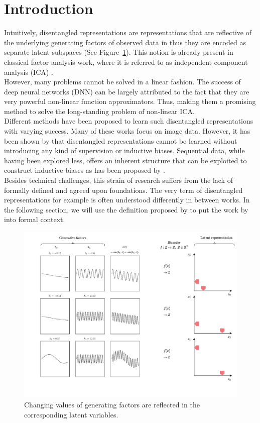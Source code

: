\documentclass{article} %
\begin{document}
\section*{Introduction}
Intuitively, disentangled representations are representations that are reflective of the underlying generating factors of observed data in thus they are encoded as separate latent subspaces (See Figure~\ref{fig:intuition}). This notion is already present in classical factor analysis work, where it is referred to as independent component analysis (ICA) \cite{comon1992independent}.\\
However, many problems cannot be solved in a linear fashion. The success of deep neural networks (DNN) can be largely attributed to the fact that they are very powerful non-linear function approximators. Thus, making them a promising method to solve the long-standing problem of non-linear ICA.\\
Different methods have been proposed to learn such disentangled representations \cite{higgins2016beta, chen2016infogan, kulkarni2015deep} with varying success. Many of these works focus on image data. However, it has been shown by \citet{locatello2019challenging} that disentangled representations cannot be learned without introducing any kind of supervision or inductive biases. Sequential data, while having been explored less, offers an inherent structure that can be exploited to construct inductive biases as has been proposed by \citet{hsu2017unsupervised}.\\
Besides technical challenges, this strain of research suffers from the lack of formally defined and agreed upon foundations. The very term of disentangled representations for example is often understood differently in between works. In the following section, we will use the definition proposed by \citet{higgins2018towards} to put the work by \citet{hsu2017unsupervised} into formal context.

\begin{figure}
	\centering
	\includegraphics[width=.9\linewidth]{../figures/intution_3x3_static.pdf}
	\caption{Changing values of generating factors are reflected in the corresponding latent variables.}
	\label{fig:intuition}
\end{figure}
\end{document}
